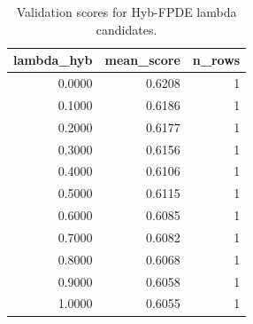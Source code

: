 \begin{table}[t]
\caption{Validation scores for Hyb-FPDE lambda candidates.}
\label{tab:lambda_distribution_computed}
\centering
\begin{tabular}{rrr}
\toprule
lambda\_hyb & mean\_score & n\_rows \\
\midrule
0.0000 & 0.6208 & 1 \\
0.1000 & 0.6186 & 1 \\
0.2000 & 0.6177 & 1 \\
0.3000 & 0.6156 & 1 \\
0.4000 & 0.6106 & 1 \\
0.5000 & 0.6115 & 1 \\
0.6000 & 0.6085 & 1 \\
0.7000 & 0.6082 & 1 \\
0.8000 & 0.6068 & 1 \\
0.9000 & 0.6058 & 1 \\
1.0000 & 0.6055 & 1 \\
\bottomrule
\end{tabular}

\end{table}
